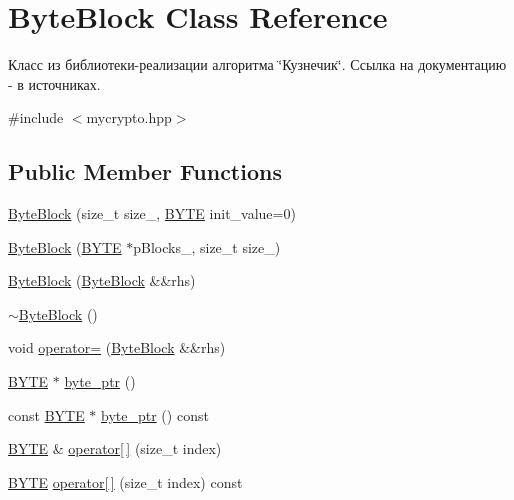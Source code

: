 \hypertarget{class_byte_block}{}\section{Byte\+Block Class Reference}
\label{class_byte_block}


Класс из библиотеки-\/реализации алгоритма \char`\"{}Кузнечик\char`\"{}. Ссылка на документацию -\/ в источниках.  




{\ttfamily \#include $<$mycrypto.\+hpp$>$}

\subsection*{Public Member Functions}
\begin{DoxyCompactItemize}
\item 
\hyperlink{class_byte_block_a39169d96104d9cb1016065e19c2b032e}{Byte\+Block} (size\+\_\+t size\+\_, \hyperlink{mycrypto_8hpp_a4ae1dab0fb4b072a66584546209e7d58}{B\+Y\+TE} init\+\_\+value=0)
\item 
\hyperlink{class_byte_block_aac1e3e7f8030c711a76aec7f716ce6ef}{Byte\+Block} (\hyperlink{mycrypto_8hpp_a4ae1dab0fb4b072a66584546209e7d58}{B\+Y\+TE} $\ast$p\+Blocks\+\_\+, size\+\_\+t size\+\_\+)
\item 
\hyperlink{class_byte_block_a1609a4a3919796383a94df4471e02478}{Byte\+Block} (\hyperlink{class_byte_block}{Byte\+Block} \&\&rhs)
\item 
\hyperlink{class_byte_block_ae34629ddad3e2185596f6fb346fb0dd8}{$\sim$\+Byte\+Block} ()
\item 
void \hyperlink{class_byte_block_af34224909c38e21d94d5c869599516ff}{operator=} (\hyperlink{class_byte_block}{Byte\+Block} \&\&rhs)
\item 
\hyperlink{mycrypto_8hpp_a4ae1dab0fb4b072a66584546209e7d58}{B\+Y\+TE} $\ast$ \hyperlink{class_byte_block_af61ceea6259a82189d1576f16931a9bf}{byte\+\_\+ptr} ()
\item 
const \hyperlink{mycrypto_8hpp_a4ae1dab0fb4b072a66584546209e7d58}{B\+Y\+TE} $\ast$ \hyperlink{class_byte_block_ad1cca46563041dfa94469213e71eeab6}{byte\+\_\+ptr} () const
\item 
\hyperlink{mycrypto_8hpp_a4ae1dab0fb4b072a66584546209e7d58}{B\+Y\+TE} \& \hyperlink{class_byte_block_a512ce89c574508343ed1c80c7422ae71}{operator\mbox{[}$\,$\mbox{]}} (size\+\_\+t index)
\item 
\hyperlink{mycrypto_8hpp_a4ae1dab0fb4b072a66584546209e7d58}{B\+Y\+TE} \hyperlink{class_byte_block_a1188eeaf7da2316bdca468ea91727cd2}{operator\mbox{[}$\,$\mbox{]}} (size\+\_\+t index) const

\end{DoxyCompactItemize}
